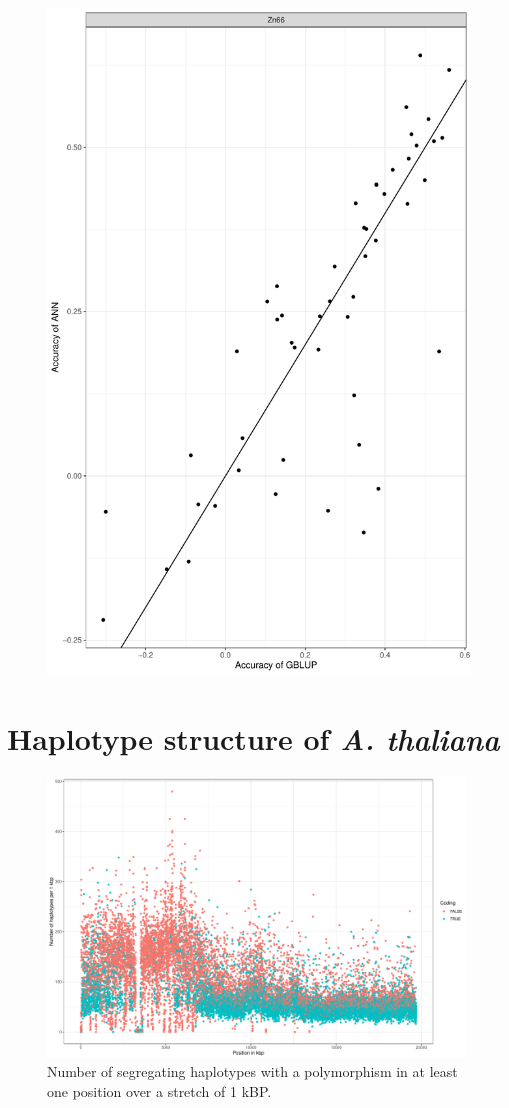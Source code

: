 \begin{figure}[H]
  \centering \includegraphics[height=.35\textheight, width=.65\textwidth]{Figures/gray_cor_plots_8}
  \decoRule
 \label{fig:bla}
\end{figure}



\section{Haplotype structure of \textit{A. thaliana}} \label{haplo:str}


\begin{figure}[th]
\centering
\includegraphics[height=.55\textheight, width=0.99\textwidth]{Figures/chr2_hap}
\decoRule
\caption[Haplotype strutcture of chromosome 2 of \textit{A. thaliana}]{Number of segregating haplotypes with a polymorphism in at least one position over a stretch of 1 kBP. }
\label{fig:chr2}
\end{figure}


